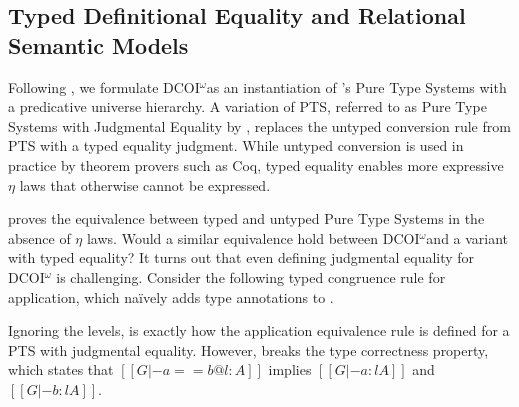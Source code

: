\documentclass[acmsmall]{acmart}
\makeatletter
\theoremstyle{linked}
\theoremstyle{deflinked}
\theoremstyle{acmdefinition}
\DeclarePairedDelimiter{\bracks}{\llbracket}{\rrbracket}
\newcommand{\name}{\texorpdfstring{DCOI$^{\omega}$\@\xspace}{DCOI-omega}}
\newcommand{\interp}[4]{\bracks{#1 \vDash_{#2} #3} \searrow #4}
\newcommand{\member}[3]{#1 \in #3(#2)}
\newcommand{\sws}[3]{#1 \vDash #2 : #3}
\makeatother
\begin{document}

\subsection{Typed Definitional Equality and Relational Semantic Models}

\label{sec:typeddefeq}
Following \citet{liu:dcoi}, we formulate \name as an instantiation of
\citeauthor{barendregt:PTS}'s Pure Type Systems with a predicative
universe hierarchy.
A variation of PTS, referred to as Pure Type Systems with Judgmental
Equality by \citet{adams:pure}, replaces the untyped conversion rule from PTS
with a typed equality judgment. While untyped conversion
is used in practice by theorem provers such as Coq,
typed equality enables more expressive $\eta$ laws
that otherwise cannot be expressed.

\citet{siles:PTS} proves the equivalence between typed and untyped
Pure Type Systems in the absence of $\eta$ laws.
Would a similar equivalence hold between \name and a variant with typed equality?
It turns out that even defining judgmental equality for \name
is challenging. Consider the following
typed congruence rule for application, which na\"ively adds type
annotations to .

{\centering
{}\par
}

Ignoring the levels,  is exactly how the application
equivalence rule is defined for a PTS with judgmental equality. However,
 breaks the
type correctness property, which states that $[[G |- a == b @ l : A]]$
implies $[[G |- a : l A]]$ and $[[G |- b : l A]]$.
\end{document}
